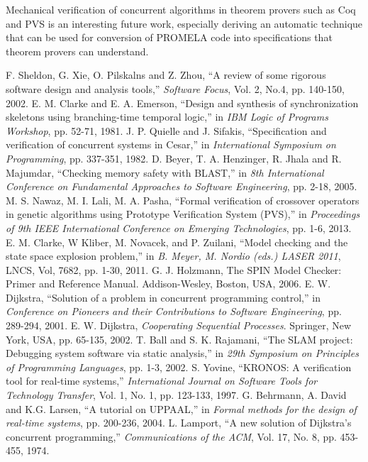 \documentclass[conference]{IEEEtran}
\begin{document}
Mechanical verification of concurrent algorithms in theorem provers such as Coq \cite{32} and PVS \cite{18} is an interesting future work, 
especially deriving an automatic technique that can be used for conversion of PROMELA code into specifications that theorem provers 
can understand.
\begin{thebibliography}{50}
 F. Sheldon, G. Xie, O. Pilskalns and Z. Zhou, “A review of some rigorous software design and analysis tools,” \emph{Software Focus}, Vol. 2, No.4, pp. 140-150, 2002.
 E. M. Clarke and E. A. Emerson, “Design and synthesis of synchronization skeletons using branching-time temporal logic,” in \emph{IBM Logic of Programs Workshop}, pp. 52-71, 1981. 
 J. P. Quielle and J. Sifakis, “Specification and verification of concurrent systems in Cesar,” in \emph{International Symposium on Programming}, pp. 337-351, 1982.
 D. Beyer, T. A. Henzinger, R. Jhala and R. Majumdar, “Checking memory safety with BLAST,” in \emph{8th International Conference on Fundamental Approaches to Software Engineering}, pp. 2-18, 2005. 
 M. S. Nawaz, M. I. Lali, M. A. Pasha, “Formal verification of crossover operators in genetic algorithms using Prototype Verification System (PVS),” in \emph{Proceedings of 9th IEEE International 
Conference on Emerging Technologies}, pp. 1-6, 2013.
 E. M. Clarke, W Kliber, M. Novacek, and P. Zuilani, “Model checking and the state space explosion problem,” in \emph{B. Meyer, M. Nordio (eds.) LASER 2011}, LNCS, Vol, 7682, pp. 1-30, 2011.
 G. J. Holzmann, The SPIN Model Checker: Primer and Reference Manual. Addison-Wesley, Boston, USA, 2006. 
 E. W. Dijkstra, “Solution of a problem in concurrent programming control,” in \emph{Conference on Pioneers and their Contributions to Software Engineering}, pp. 289-294, 2001.
 E. W. Dijkstra, \emph{Cooperating Sequential Processes}.  Springer, New York, USA, pp. 65-135, 2002. 
 T. Ball and S. K. Rajamani, “The SLAM project: Debugging system software via static analysis,” in \emph{29th Symposium on Principles of Programming Languages}, pp. 1-3, 2002.
 S. Yovine, “KRONOS:  A verification tool for real-time systems,” \emph{International Journal on Software Tools for Technology Transfer}, Vol. 1, No. 1, pp. 123-133, 1997.
 G. Behrmann, A. David and K.G. Larsen, “A tutorial on UPPAAL,” in \emph{Formal methods for the design of real-time systems}, pp. 200-236, 2004.
 L. Lamport, “A new solution of Dijkstra’s concurrent programming,” \emph{Communications of the ACM}, Vol. 17, No. 8, pp. 453-455, 1974.   

\end{thebibliography}
\end{document}
